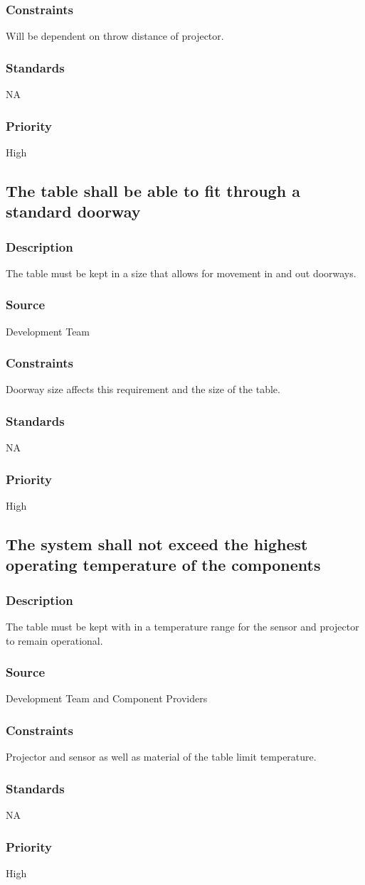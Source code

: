 \subsubsection{Constraints}
Will be dependent on throw distance of projector.
\subsubsection{Standards}
NA
\subsubsection{Priority}
High

\subsection{The table shall be able to fit through a standard doorway }
\subsubsection{Description}
The table must be kept in a size that allows for movement in and out doorways.
\subsubsection{Source}
Development Team
\subsubsection{Constraints}
Doorway size affects this requirement and the size of the table.
\subsubsection{Standards}
NA
\subsubsection{Priority}
High

\subsection{The system shall not exceed the highest operating temperature of the components }
\subsubsection{Description}
The table must be kept with in a temperature range for the sensor and projector to remain operational. 
\subsubsection{Source}
Development Team and Component Providers
\subsubsection{Constraints}
Projector and sensor as well as material of the table limit temperature.
\subsubsection{Standards}
NA
\subsubsection{Priority}
High
